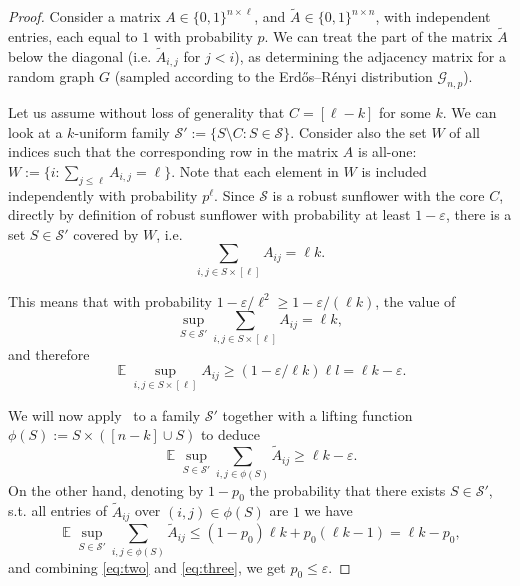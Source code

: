 \documentclass[10pt,a4paper]{article}
\DeclareMathOperator{\E}{\mathbb{E}}
\begin{document}
\begin{proof}
Consider a matrix $A \in \{0, 1\}^{n \times \ell}$, and $\tilde{A} \in \{0, 1\}^{n \times n}$, with independent entries, each equal to $1$ with probability $p$. We can treat the part of the matrix $\tilde{A}$  below the diagonal (i.e. $\tilde{A}_{i,j}$ for $j < i$), as determining the adjacency matrix for a random graph $G$ (sampled according to the Erdős–Rényi distribution $\mathcal{G}_{n,p}$).

Let us assume without loss of generality that $C = [\ell-k]$ for some $k$. We can look at a $k$-uniform family $\mathcal{S}' := \{S \setminus C : S \in \mathcal{S}\}$. Consider also the set $W$ of all indices such that the corresponding row in the matrix $A$ is all-one: $W := \{i : \sum_{j\leq \ell} A_{i,j} = \ell \}$. Note that each element in $W$ is included independently with probability $p^\ell$. Since $\mathcal{S}$ is a robust sunflower with the core $C$, directly by definition of robust sunflower with probability at least $1-\varepsilon$, there is a set $S \in \mathcal{S}'$ covered by $W$, i.e. 
\begin{equation*}
    \sum_{i,j \in S \times [\ell]} A_{ij} = \ell k.
\end{equation*}

This means that with probability $1-\varepsilon/\ell^2 \geq 1-\varepsilon/(\ell k)$, the value of
\begin{equation*}
    \sup_{S \in \mathcal{S}'} \sum_{i,j \in S \times [\ell]} A_{ij} = \ell k,
\end{equation*}
and therefore
\begin{equation*}
    \E \sup_{i,j \in S \times [\ell]} A_{ij}\geq (1-\varepsilon/\ell k)\ell l = \ell k - \varepsilon.
\end{equation*}

We will now apply~
 to a family $\mathcal{S}'$ together with a lifting function $\phi(S) := S \times ([n-k] \cup S)$ to deduce
\begin{equation}
\label{eq:two}
    \E \sup_{S \in \mathcal{S'}} \sum_{i,j \in \phi(S)} \tilde{A}_{ij}\geq  \ell k - \varepsilon.
\end{equation}
On the other hand, denoting by $1 - p_0$ the probability that there exists $S \in \mathcal{S'}$, s.t. all entries of $\tilde{A}_{ij}$ over $(i,j) \in \phi(S)$ are $1$ we have
\begin{equation}
\label{eq:three}
 \E \sup_{S \in \mathcal{S'}} \sum_{i,j \in \phi(S)} \tilde{A}_{ij} \leq (1 - p_0) \ell k + p_0 (\ell k - 1) = \ell k - p_0,    
\end{equation}
and combining \eqref{eq:two} and \eqref{eq:three}, we get $p_0 \leq \varepsilon$.


\end{proof}
\end{document}
